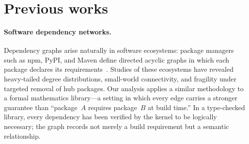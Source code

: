\section{Previous works}

\paragraph{Software dependency networks.}
Dependency graphs arise naturally in software ecosystems: package managers such as npm, PyPI, and Maven define directed acyclic graphs in which each package declares its requirements~\cite{decan2019,labelle2004}. Studies of these ecosystems have revealed heavy-tailed degree distributions, small-world connectivity, and fragility under targeted removal of hub packages. Our analysis applies a similar methodology to a formal mathematics library---a setting in which every edge carries a stronger guarantee than ``package~$A$ requires package~$B$ at build time.'' In a type-checked library, every dependency has been verified by the kernel to be logically necessary; the graph records not merely a build requirement but a semantic relationship.

